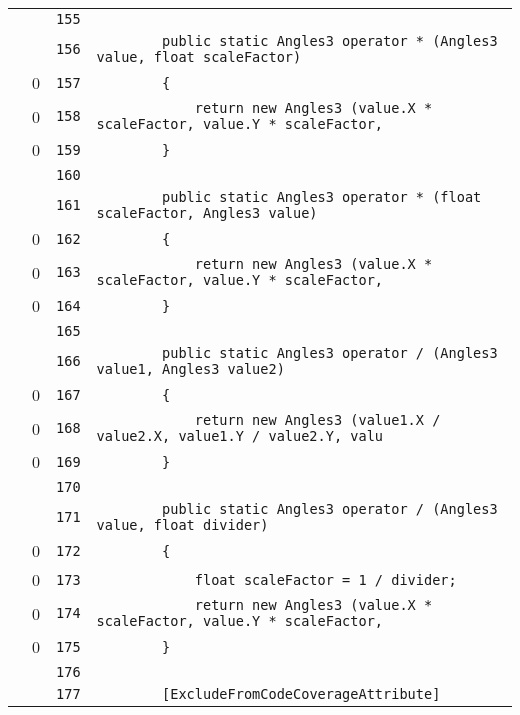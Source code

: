 \documentclass[a4paper,10pt]{article}
\begin{document}
\begin{longtable}[l]{lrrl}
\cellcolor{gray} &  & \verb~155~ & \verb~~\\
\cellcolor{gray} &  & \verb~156~ & \verb~        public static Angles3 operator * (Angles3 value, float scaleFactor)~\\
\cellcolor{red} & 0 & \verb~157~ & \verb~        {~\\
\cellcolor{red} & 0 & \verb~158~ & \verb~            return new Angles3 (value.X * scaleFactor, value.Y * scaleFactor, ~\\
\cellcolor{red} & 0 & \verb~159~ & \verb~        }~\\
\cellcolor{gray} &  & \verb~160~ & \verb~~\\
\cellcolor{gray} &  & \verb~161~ & \verb~        public static Angles3 operator * (float scaleFactor, Angles3 value)~\\
\cellcolor{red} & 0 & \verb~162~ & \verb~        {~\\
\cellcolor{red} & 0 & \verb~163~ & \verb~            return new Angles3 (value.X * scaleFactor, value.Y * scaleFactor, ~\\
\cellcolor{red} & 0 & \verb~164~ & \verb~        }~\\
\cellcolor{gray} &  & \verb~165~ & \verb~~\\
\cellcolor{gray} &  & \verb~166~ & \verb~        public static Angles3 operator / (Angles3 value1, Angles3 value2)~\\
\cellcolor{red} & 0 & \verb~167~ & \verb~        {~\\
\cellcolor{red} & 0 & \verb~168~ & \verb~            return new Angles3 (value1.X / value2.X, value1.Y / value2.Y, valu~\\
\cellcolor{red} & 0 & \verb~169~ & \verb~        }~\\
\cellcolor{gray} &  & \verb~170~ & \verb~~\\
\cellcolor{gray} &  & \verb~171~ & \verb~        public static Angles3 operator / (Angles3 value, float divider)~\\
\cellcolor{red} & 0 & \verb~172~ & \verb~        {~\\
\cellcolor{red} & 0 & \verb~173~ & \verb~            float scaleFactor = 1 / divider;~\\
\cellcolor{red} & 0 & \verb~174~ & \verb~            return new Angles3 (value.X * scaleFactor, value.Y * scaleFactor, ~\\
\cellcolor{red} & 0 & \verb~175~ & \verb~        }~\\
\cellcolor{gray} &  & \verb~176~ & \verb~~\\
\cellcolor{gray} &  & \verb~177~ & \verb~        [ExcludeFromCodeCoverageAttribute]~\\

\end{longtable}
\end{document}
